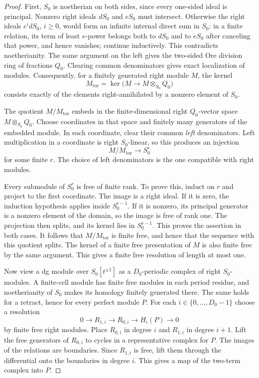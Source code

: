 \begin{proof}
First, $S_0$ is noetherian on both sides, since every one-sided
ideal is principal.  Nonzero right ideals $dS_0$ and $eS_0$ must
intersect.  Otherwise the right ideals $e^i dS_0$, $i\geq0$,
would form an infinite internal direct sum in $S_0$: in a finite
relation, its term of least $e$-power belongs both to $dS_0$ and
to $eS_0$ after canceling that power, and hence vanishes; continue
inductively.  This contradicts noetherianity.  The same argument
on the left gives the two-sided Ore division ring of fractions
$Q_0$.  Clearing common
denominators gives exact localization of modules.  Consequently,
for a finitely generated right module $M$, the kernel
\[
 M_{\mathrm{tor}}=\ker\bigl(M\longrightarrow M\otimes_{S_0}Q_0\bigr)
\]
consists exactly of the elements right-annihilated by a nonzero
element of $S_0$.

The quotient $M/M_{\mathrm{tor}}$ embeds in the finite-dimensional
right $Q_0$-vector space $M\otimes_{S_0}Q_0$.  Choose coordinates
in that space and finitely many generators of the embedded module.
In each coordinate, clear their common \emph{left} denominators.
Left multiplication in a coordinate is right $S_0$-linear, so this
produces an injection
\[
 M/M_{\mathrm{tor}}\longrightarrow S_0^r
\]
for some finite $r$.  The choice of left denominators is the one
compatible with right modules.

Every submodule of $S_0^r$ is free of finite rank.  To prove this,
induct on $r$ and project to the first coordinate.  The image is
a right ideal.  If it is zero, the induction hypothesis applies
inside $S_0^{r-1}$.  If it is nonzero, its principal generator is
a nonzero element of the domain, so the image is free of rank one.
The projection then splits, and its kernel lies in $S_0^{r-1}$.
This proves the assertion in both cases.  It follows that
$M/M_{\mathrm{tor}}$ is finite free, and hence that the sequence
with this quotient splits.  The kernel of a finite free presentation
of $M$ is also finite free by the same argument.  This gives a
finite free resolution of length at most one.

Now view a dg module over $S_0[t^{\pm1}]$ as a $D_0$-periodic
complex of right $S_0$-modules.  A finite-cell module has finite
free modules in each period residue, and noetherianity of $S_0$
makes its homology finitely generated there.  The same holds for
a retract, hence for every perfect module $P$.
For each $i\in\{0,\ldots,D_0-1\}$ choose a resolution
\[
 0\longrightarrow R_{1,i}\longrightarrow R_{0,i}
   \longrightarrow H_i(P)\longrightarrow0
\]
by finite free right modules.  Place $R_{0,i}$ in degree $i$ and
$R_{1,i}$ in degree $i+1$.  Lift the free generators of $R_{0,i}$
to cycles in a representative complex for $P$.  The images of
the relations are boundaries.  Since $R_{1,i}$ is free, lift them
through the differential onto the boundaries in degree $i$.
This gives a map of the two-term complex into $P$.


\end{proof}
